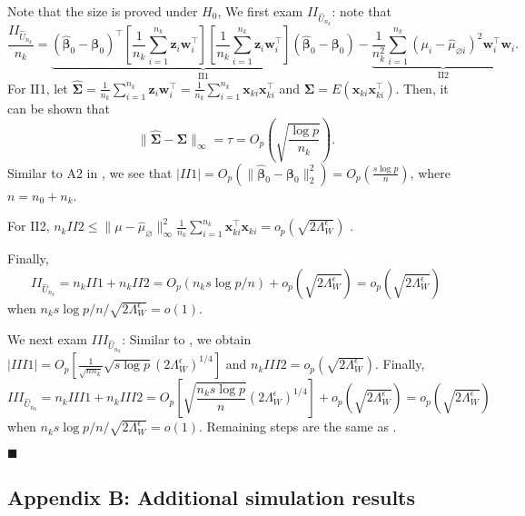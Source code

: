 \documentclass[twoside,12pt]{article}
\newcommand{\mb}[1]{\boldsymbol{\mathbf{#1}}}
\newcommand{\wh}[1]{\widehat{#1}}
\begin{document}
Note that the size is proved under $H_0$, 
We first exam $II_{\hat U_{n_k}}$: note that 
$$\frac{II_{\hat U_{n_k}}}{n_k}=\underbrace{(\wh{\mb\beta}_0-\mb\beta_0)^\top\left[\frac1{n_k}\sum_{i=1}^{n_k}\mb z_i\mb w_i^\top\right]\left[\frac1{n_k}\sum_{i=1}^{n_k}\mb z_i\mb w_i^\top\right](\wh{\mb\beta}_0-\mb\beta_0)}_\text{II1}-\underbrace{\frac1{n_k^2}\sum_{i=1}^{n_k} (\mu_i-\hat{\mu}_{\varnothing i})^2 \mb w_i^\top\mb w_i}_\text{II2}.$$
For II1, let $\wh{\mb\Sigma}=\frac1{n_k}\sum_{i=1}^{n_k}\mb z_i\mb w_i^\top=\frac1{n_k}\sum_{i=1}^{n_k}\mb x_{ki}\mb x_{ki}^\top$ and $\mb\Sigma=E(\mb x_{ki}\mb x_{ki}^\top)$. 
Then, it can be shown that 
$$\|\wh{\mb\Sigma}-\mb\Sigma\|_{\infty}=\tau=O_p\left(\sqrt{\frac{\log p}{n_k}}\right).$$
Similar to A2 in \citet{chen2022testing}, we see that $|II1|=O_p(\|\wh{\mb\beta}_0-\mb\beta_0\|_2^2)=O_p\left(\frac{s\log p}{n}\right)$, where $n=n_0+n_k$.

For II2, $n_k II2\leq \|\mu-\hat{\mu}_{\varnothing}\|_{\infty}^2\frac1{n_k}\sum_{i=1}^{n_k} \mb x_{ki}^\top \mb x_{ki}=o_p(\sqrt{2\Lambda_W^{\epsilon}})$ .

Finally, $$II_{\hat U_{n_k}}=n_k II1+n_k II2=O_p(n_k s\log p/n)+o_p(\sqrt{2\Lambda_W^{\epsilon}})=o_p(\sqrt{2\Lambda_W^{\epsilon}})$$ 
when $n_k s\log p/n/\sqrt{2\Lambda_W^{\epsilon}}=o(1)$.

We next exam $III_{\hat U_{n_k}}$: Similar to \citet{chen2022testing}, we obtain $|III1|=O_p[\frac1{\sqrt{n n_k}}\sqrt{s\log p}(2\Lambda_W^{\epsilon})^{1/4}]$ and $n_k III2=o_p(\sqrt{2\Lambda_W^{\epsilon}})$.
Finally, 
$$III_{\hat U_{n_k}}=n_k III1+n_k III2=O_p\left[\sqrt{\frac{n_k s\log p}{n}}(2\Lambda_W^{\epsilon})^{1/4}\right]+o_p\left(\sqrt{2\Lambda_W^{\epsilon}}\right)=o_p\left(\sqrt{2\Lambda_W^{\epsilon}}\right)$$
when $n_k s\log p/n/\sqrt{2\Lambda_W^{\epsilon}}=o(1)$.
Remaining steps are the same as \citet{chen2022testing}.


$\blacksquare$


\subsection*{Appendix B: Additional simulation results}
\label{simu: other}
\end{document}
